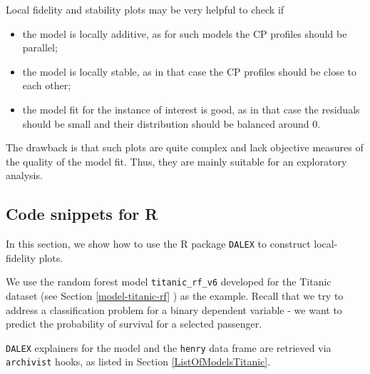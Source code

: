 \documentclass[12pt,]{krantz}
\newenvironment{Shaded}{\begin{snugshade}}{\end{snugshade}}
\newcommand{\CommentTok}[1]{\textcolor[rgb]{0.56,0.35,0.01}{\textit{#1}}}
\newcommand{\DataTypeTok}[1]{\textcolor[rgb]{0.13,0.29,0.53}{#1}}
\newcommand{\KeywordTok}[1]{\textcolor[rgb]{0.13,0.29,0.53}{\textbf{#1}}}
\newcommand{\NormalTok}[1]{#1}
\newcommand{\OperatorTok}[1]{\textcolor[rgb]{0.81,0.36,0.00}{\textbf{#1}}}
\newcommand{\OtherTok}[1]{\textcolor[rgb]{0.56,0.35,0.01}{#1}}
\newcommand{\StringTok}[1]{\textcolor[rgb]{0.31,0.60,0.02}{#1}}
\providecommand{\tightlist}{%
  \setlength{\itemsep}{0pt}\setlength{\parskip}{0pt}}
\begin{document}
Local fidelity and stability plots may be very helpful to check if

\begin{itemize}
\tightlist
\item
  the model is locally additive, as for such models the CP profiles should be parallel;
\item
  the model is locally stable, as in that case the CP profiles should be close to each other;
\item
  the model fit for the instance of interest is good, as in that case the residuals should be small and their distribution should be balanced around 0.
\end{itemize}

The drawback is that such plots are quite complex and lack objective measures of the quality of the model fit. Thus, they are mainly suitable for an exploratory analysis.

\hypertarget{cPLocDiagR}{%
\subsection{Code snippets for R}\label{cPLocDiagR}}

In this section, we show how to use the R package \texttt{DALEX} \citep{DALEX} to construct local-fidelity plots.

We use the random forest model \texttt{titanic\_rf\_v6} developed for the Titanic dataset (see Section \ref{model-titanic-rf} ) as the example. Recall that we try to address a classification problem for a binary dependent variable - we want to predict the probability of survival for a selected passenger.

\texttt{DALEX} explainers for the model and the \texttt{henry} data frame are retrieved via \texttt{archivist} hooks, as listed in Section \ref{ListOfModelsTitanic}.

\begin{Shaded}
\end{Shaded}
\end{document}
